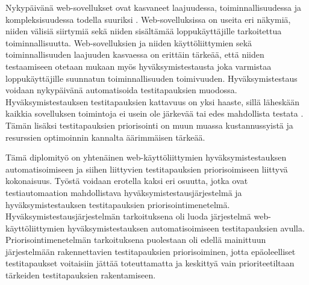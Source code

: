 Nykypäivänä web-sovellukset ovat kasvaneet laajuudessa, toiminnallisuudessa ja komp\-lek\-si\-suu\-des\-sa todella suuriksi \parencite{web_app_complexity}.
Web-sovelluksissa on useita eri näkymiä, niiden välisiä siirtymiä sekä niiden sisältämää loppukäyttäjille tarkoitettua toiminnallisuutta.
Web-sovelluksien ja niiden käyttöliittymien sekä toiminnallisuuden laajuuden kasvaessa on erittäin tärkeää, että niiden testaamiseen otetaan mukaan myös hyväksymistestausta joka varmistaa loppukäyttäjille suunnatun toiminnallisuuden toimivuuden.
Hyväksymistestaus voidaan nykypäivänä automatisoida testitapauksien muodossa.
Hyväksymistestauksen testitapauksien kattavuus on yksi haaste, sillä läheskään kaikkia sovelluksen toimintoja ei usein ole järkevää tai edes mahdollista testata \parencite{testing_possibility}.
Tämän lisäksi testitapauksien priorisointi on muun muassa kustannussyistä ja resurssien optimoinnin kannalta äärimmäisen tärkeää.

Tämä diplomityö on yhtenäinen web-käyttöliittymien hyväksymistestauksen automatisoimiseen ja siihen liittyvien testitapauksien priorisoimiseen liittyvä kokonaisuus.
Työstä voidaan erotella kaksi eri osuutta, jotka ovat testiautomaation mahdollistava hyväksymistestausjärjestelmä ja hyväksymistestauksen testitapauksien priorisointimenetelmä.
Hyväksymistestausjärjestelmän tarkoituksena oli luoda järjestelmä web-käyttöliittymien hyväksymistestauksen automatisoimiseen testitapauksien avulla.
Priorisointimenetelmän tarkoituksena puolestaan oli edellä mainittuun järjestelmään rakennettavien testitapauksien priorisoiminen, jotta epäoleelliset testitapaukset voitaisiin jättää toteuttamatta ja keskittyä vain prioriteetiltaan tärkeiden testitapauksien rakentamiseen.

